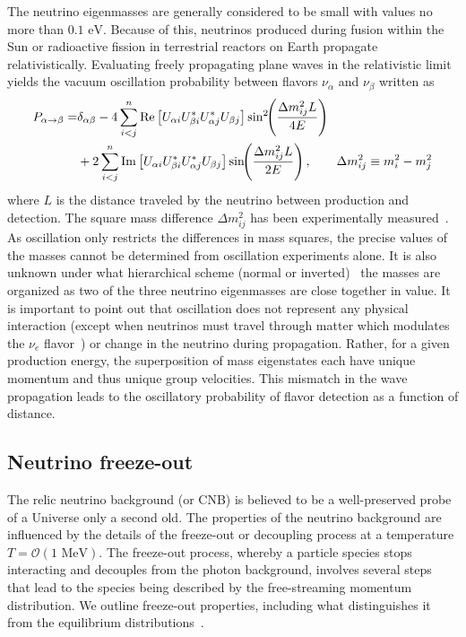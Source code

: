 \documentclass[universe,article,submit,moreauthors,pdftex,a4paper]{Definitions/mdpi}
\newcommand{\MeV}{\text{ MeV}}
\newcommand{\eV}{\text{ eV}}
\begin{document}
The neutrino eigenmasses are generally considered to be small with values no more than $0.1\eV$. Because of this, neutrinos produced during fusion within the Sun or radioactive fission in terrestrial reactors on Earth propagate relativistically. Evaluating freely propagating plane waves in the relativistic limit yields the vacuum oscillation probability between flavors $\nu_\alpha$ and $\nu_\beta$ written as~\cite{ParticleDataGroup:2022pth}
\begin{align}\label{NuOscillation}
  P_{\alpha\rightarrow\beta}
 =&\delta_{\alpha\beta}-4\sum_{i<j}^n \mathrm{Re}\left[U_{\alpha i}U^\ast_{\beta i}U^\ast_{\alpha j}U_{\beta j}\right]\sin^2\!\!\left(\frac{\Delta m^2_{ij}L}{4E}\right)\notag\\
 &+2\sum_{i<j}^n \mathrm{Im}\left[U_{\alpha i}U^\ast_{\beta i}U^\ast_{\alpha j}U_{\beta j}\right]\sin\!\!\left(\frac{\Delta m^2_{ij}L}{2E}\right)
 ,\qquad\Delta m^2_{ij}\equiv{m^2_i-m^2_j}
\end{align}
where $L$ is the distance traveled by the neutrino between production and detection. The square mass difference $\Delta m^2_{ij}$ has been experimentally measured~\cite{ParticleDataGroup:2022pth}. As oscillation only restricts the differences in mass squares, the precise values of the masses cannot be determined from oscillation experiments alone. It is also unknown under what hierarchical scheme (normal or inverted)~\cite{Avignone:2007fu,Esteban:2020cvm} the masses are organized as two of the three neutrino eigenmasses are close together in value. It is important to point out that oscillation does not represent any physical interaction (except when neutrinos must travel through matter which modulates the $\nu_{e}$ flavor~\cite{NuSTEC:2017hzk,DUNE:2020ypp}) or change in the neutrino during propagation. Rather, for a given production energy, the superposition of mass eigenstates each have unique momentum and thus unique group velocities. This mismatch in the wave propagation leads to the oscillatory probability of flavor detection as a function of distance.

\subsection{Neutrino freeze-out}\label{sec:Freezeout}
\noindent The relic neutrino background (or CNB) is believed to be a well-preserved probe of a Universe only a second old. The properties of the neutrino background are influenced by the details of the freeze-out or decoupling process at a temperature $T=\mathcal{O}(1\MeV)$. The freeze-out process, whereby a particle species stops interacting and decouples from the photon background, involves several steps that lead to the species being described by the free-streaming momentum distribution. We outline freeze-out properties, including what distinguishes it from the equilibrium distributions~\cite{Birrell:2012gg}.
\end{document}

